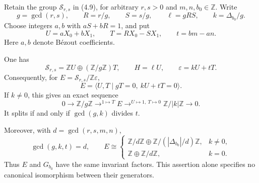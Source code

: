 \documentclass[11pt]{article}
\numberwithin{equation}{section}
\begin{document}
Retain the group $\mathcal S_{r,s}$ in (4.9), for arbitrary $r,s>0$ and
$m,n,b_0\in\mathbb Z$.  Write
\[
 g=\gcd(r,s),\qquad R=r/g,\qquad S=s/g,\qquad
 \ell=gRS,\qquad k=\Delta_{b_0}/g.
\]
Choose integers $a,b$ with $aS+bR=1$, and put
\begin{equation}\label{eq:seifert-split}
 U=aX_0+bX_1,\qquad T=RX_0-SX_1,\qquad t=bm-an.
\end{equation}
Here $a,b$ denote B\'ezout coefficients.

\begin{theorem}\label{thm:extension}
One has
\begin{equation}\label{eq:class-coordinates}
 \mathcal S_{r,s}=\mathbb ZU\oplus(\mathbb Z/g\mathbb Z)T,
 \qquad H=\ell U,\qquad \varepsilon=kU+tT.
\end{equation}
Consequently, for $E=\mathcal S_{r,s}/\mathbb Z\varepsilon$,
\begin{equation}\label{eq:extension-presentation}
 E=\langle U,T\mid gT=0,\ kU+tT=0\rangle.
\end{equation}
If $k\ne0$, this gives an exact sequence
\begin{equation}\label{eq:extension-sequence}
 0\longrightarrow\mathbb Z/g\mathbb Z
 \mathrel{\mathop{\longrightarrow}^{1\mapsto T}}E
 \mathrel{\mathop{\longrightarrow}^{U\mapsto1,\ T\mapsto0}}
 \mathbb Z/|k|\mathbb Z\longrightarrow0.
\end{equation}
It splits if and only if $\gcd(g,k)$ divides $t$.

Moreover, with $d=\gcd(r,s,m,n)$,
\[
 \gcd(g,k,t)=d,\qquad
 E\cong
 \begin{cases}
 \mathbb Z/d\mathbb Z\oplus\mathbb Z/(|\Delta_{b_0}|/d)\mathbb Z,
       &k\ne0,\\
 \mathbb Z\oplus\mathbb Z/d\mathbb Z,&k=0.
 \end{cases}
\]
Thus $E$ and $G_{b_0}$ have the same invariant factors.
This assertion alone specifies no canonical isomorphism between their generators.
\end{theorem}
\end{document}
